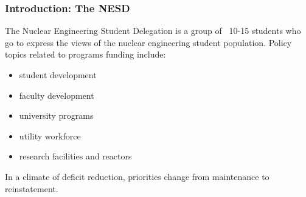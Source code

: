 \begin{frame}[ctb!]
  \frametitle{Introduction: The NESD}
  The Nuclear Engineering Student Delegation is a group of ~10-15 students
  who go to express the views of the nuclear engineering student population.
  \newline
  \pause
  Policy topics related to programs funding include:
  \begin{itemize}
    \item student development
    \item faculty development
    \item university programs
    \item utility workforce
    \item research facilities and reactors
  \end{itemize}
  \pause
  In a climate of deficit reduction, priorities change from maintenance to reinstatement.
\end{frame}
